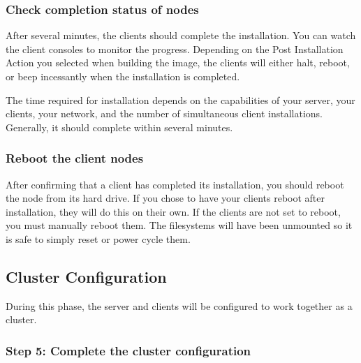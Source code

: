\subsubsection{Check completion status of nodes}
\label{det:clientfinish}

After several minutes, the clients should complete the installation.
You can watch the client consoles to monitor the progress. Depending
on the Post Installation Action you selected when building the image,
the clients will either halt, reboot, or beep incessantly when the
installation is completed.

The time required for installation depends on the capabilities of your
server, your clients, your network, and the number of simultaneous
client installations.  Generally, it should complete within several
minutes.
  

\subsubsection{Reboot the client nodes}

After confirming that a client has completed its installation, you
should reboot the node from its hard drive. If you chose to have your
clients reboot after installation, they will do this on their
own. If the clients are not set to reboot, you must manually
reboot them. The filesystems will have been unmounted so it is safe
to simply reset or power cycle them.



\subsection{Cluster Configuration}

During this phase, the server and clients will be configured to work
together as a cluster.


\subsubsection{Step 5: Complete the cluster configuration}
\label{det:completeinstall}

